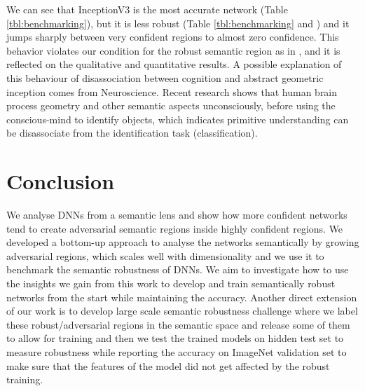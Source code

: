 We can see that InceptionV3 is the most accurate network (Table \ref{tbl:benchmarking}), but it is less robust (Table \ref{tbl:benchmarking} and \figLabel{\ref{fig:NMS}}) and it jumps sharply between very confident regions to almost zero confidence. This behavior violates our condition for the robust semantic region as in \eqLabel{\ref{eq:phi-rob}}, and it is reflected on the qualitative and quantitative results. A possible explanation of this behaviour of disassociation between cognition and abstract geometric inception comes from Neuroscience. Recent research shows that human brain process geometry and other semantic aspects unconsciously, before using the conscious-mind to identify objects\cite{think}, which indicates primitive understanding can be disassociate from the identification task (\eg classification).



\section{Conclusion}%
We analyse DNNs from a semantic lens and show how more confident networks tend to create adversarial semantic regions inside highly confident regions. We developed a bottom-up approach to analyse the networks semantically by growing adversarial regions, which scales well with dimensionality and we use it to benchmark the semantic robustness of DNNs. We aim to investigate how to use the insights we gain from this work to develop and train semantically robust networks from the start while maintaining the accuracy. Another direct extension of our work is to develop large scale semantic robustness challenge where we label these robust/adversarial regions in the semantic space and release some of them to allow for training and then we test the trained models on hidden test set to measure robustness while reporting the accuracy on ImageNet validation set to make sure that the features of the model did not get affected by the robust training.
























